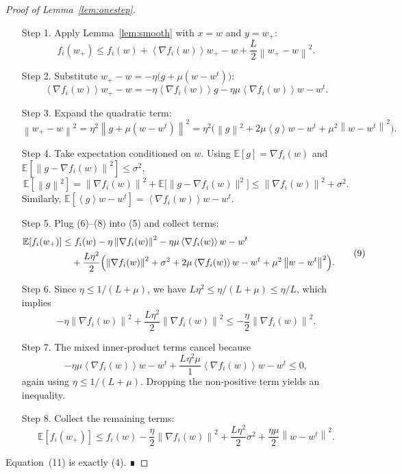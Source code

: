 \documentclass{article}
\newcommand{\E}{\mathbb{E}}
\newcommand{\norm}[1]{\left\lVert#1\right\rVert}
\newcommand{\inner}[1]{\left\langle#1\right\rangle}
\begin{document}
\begin{proof}[Proof of Lemma~\ref{lem:onestep}]
\begin{enumerate}
\item[Step 1.] Apply Lemma~\ref{lem:smooth} with $x=w$ and $y=w_{+}$:
\[
f_i(w_{+})\le f_i(w)+\inner{\nabla f_i(w)}{w_{+}-w}
+\frac{L}{2}\norm{w_{+}-w}^{2}.
\tag{5}
\]
\item[Step 2.] Substitute $w_{+}-w=-\eta\bigl(g+\mu(w-w^{t})\bigr)$:
\[
\inner{\nabla f_i(w)}{w_{+}-w}
=-\eta\inner{\nabla f_i(w)}{g}
-\eta\mu\inner{\nabla f_i(w)}{w-w^{t}}.
\tag{6}
\]
\item[Step 3.] Expand the quadratic term:
\[
\norm{w_{+}-w}^{2}
=\eta^{2}\norm{g+\mu(w-w^{t})}^{2}
=\eta^{2}\bigl(\norm{g}^{2}+2\mu\inner{g}{w-w^{t}}+\mu^{2}\norm{w-w^{t}}^{2}\bigr).
\tag{7}
\]
\item[Step 4.] Take expectation conditioned on $w$.
Using $\E[g]=\nabla f_i(w)$ and $\E[\norm{g-\nabla f_i(w)}^{2}]\le\sigma^{2}$,
\[
\E[\norm{g}^{2}]
=\norm{\nabla f_i(w)}^{2}+\E\!\bigl[\|g-\nabla f_i(w)\|^{2}\bigr]
\le \norm{\nabla f_i(w)}^{2}+\sigma^{2}.
\tag{8}
\]
Similarly, $\E[\inner{g}{w-w^{t}}]=\inner{\nabla f_i(w)}{w-w^{t}}$.
\item[Step 5.] Plug (6)–(8) into (5) and collect terms:
\[
\begin{aligned}
\E[f_i(w_{+})]
&\le f_i(w)-\eta\norm{\nabla f_i(w)}^{2}
-\eta\mu\inner{\nabla f_i(w)}{w-w^{t}}\\
&\quad+\frac{L\eta^{2}}{2}\Bigl(\norm{\nabla f_i(w)}^{2}+\sigma^{2}
+2\mu\inner{\nabla f_i(w)}{w-w^{t}}+\mu^{2}\norm{w-w^{t}}^{2}\Bigr).
\end{aligned}
\tag{9}
\]
\item[Step 6.] Since $\eta\le 1/(L+\mu)$, we have $L\eta^{2}\le \eta/(L+\mu)\le\eta/ L$, which implies
\[
-\eta\norm{\nabla f_i(w)}^{2}+\frac{L\eta^{2}}{2}\norm{\nabla f_i(w)}^{2}
\le -\frac{\eta}{2}\norm{\nabla f_i(w)}^{2}.
\tag{10}
\]
\item[Step 7.] The mixed inner‑product terms cancel because
\[
-\eta\mu\inner{\nabla f_i(w)}{w-w^{t}}
+\frac{L\eta^{2}\mu}{1}\inner{\nabla f_i(w)}{w-w^{t}}
\le 0,
\]
again using $\eta\le 1/(L+\mu)$.  Dropping the non‑positive term yields an inequality.
\item[Step 8.] Collect the remaining terms:
\[
\E[f_i(w_{+})]
\le f_i(w)-\frac{\eta}{2}\norm{\nabla f_i(w)}^{2}
+\frac{L\eta^{2}}{2}\sigma^{2}
+\frac{\eta\mu}{2}\norm{w-w^{t}}^{2}.
\tag{11}
\]
\end{enumerate}
Equation~(11) is exactly (4).  ∎
\end{proof}
\end{document}
